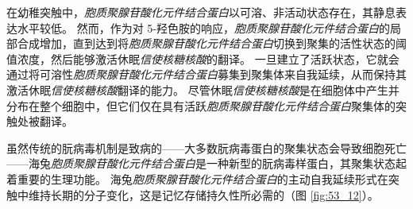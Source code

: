 在幼稚突触中，\textit{胞质聚腺苷酸化元件结合蛋白}以可溶、非活动状态存在，其静息表达水平较低。
然而，作为对 5-羟色胺的响应，\textit{胞质聚腺苷酸化元件结合蛋白}的局部合成增加，直到达到将\textit{胞质聚腺苷酸化元件结合蛋白}切换到聚集的活性状态的阈值浓度，然后能够激活休眠\textit{信使核糖核酸}的翻译。
一旦建立了活跃状态，它就会通过将可溶性\textit{胞质聚腺苷酸化元件结合蛋白}募集到聚集体来自我延续，从而保持其激活休眠\textit{信使核糖核酸}翻译的能力。
尽管休眠\textit{信使核糖核酸}是在细胞体中产生并分布在整个细胞中，但它们仅在具有活跃\textit{胞质聚腺苷酸化元件结合蛋白}聚集体的突触处被翻译。


虽然传统的朊病毒机制是致病的——大多数朊病毒蛋白的聚集状态会导致细胞死亡——海兔\textit{胞质聚腺苷酸化元件结合蛋白}是一种新型的朊病毒样蛋白，其聚集状态起着重要的生理功能。
海兔\textit{胞质聚腺苷酸化元件结合蛋白}的主动自我延续形式在突触中维持长期的分子变化，这是记忆存储持久性所必需的（图 \ref{fig:53_12}）。


